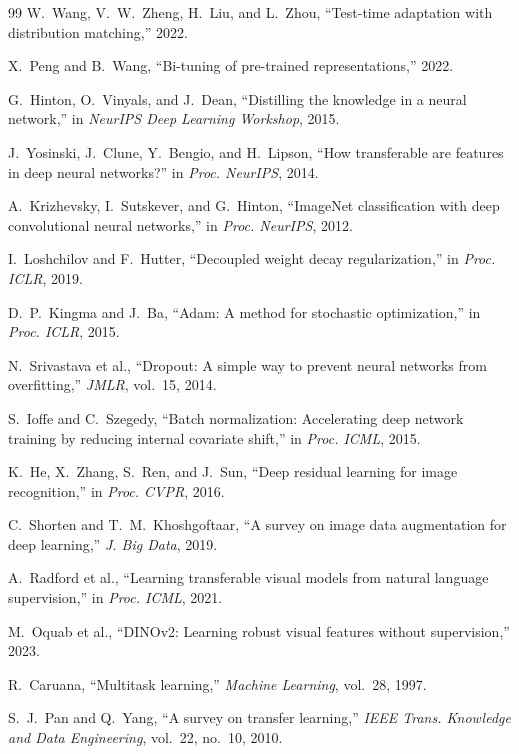 \documentclass[preprint,12pt,number]{elsarticle}
\begin{document}
\begin{thebibliography}{99}
W.~Wang, V.~W.~Zheng, H.~Liu, and L.~Zhou, ``Test-time adaptation with
distribution matching,'' 2022.

X.~Peng and B.~Wang, ``Bi-tuning of pre-trained representations,'' 2022.

G.~Hinton, O.~Vinyals, and J.~Dean, ``Distilling the knowledge in a neural
network,'' in \emph{NeurIPS Deep Learning Workshop}, 2015.

J.~Yosinski, J.~Clune, Y.~Bengio, and H.~Lipson, ``How transferable are
features in deep neural networks?'' in \emph{Proc. NeurIPS}, 2014.

A.~Krizhevsky, I.~Sutskever, and G.~Hinton, ``ImageNet classification with
deep convolutional neural networks,'' in \emph{Proc. NeurIPS}, 2012.

I.~Loshchilov and F.~Hutter, ``Decoupled weight decay regularization,'' in
\emph{Proc. ICLR}, 2019.

D.~P.~Kingma and J.~Ba, ``Adam: A method for stochastic optimization,'' in
\emph{Proc. ICLR}, 2015.

N.~Srivastava et al., ``Dropout: A simple way to prevent neural networks
from overfitting,'' \emph{JMLR}, vol.~15, 2014.

S.~Ioffe and C.~Szegedy, ``Batch normalization: Accelerating deep network
training by reducing internal covariate shift,'' in \emph{Proc. ICML}, 2015.

K.~He, X.~Zhang, S.~Ren, and J.~Sun, ``Deep residual learning for image
recognition,'' in \emph{Proc. CVPR}, 2016.

C.~Shorten and T.~M.~Khoshgoftaar, ``A survey on image data augmentation
for deep learning,'' \emph{J. Big Data}, 2019.

A.~Radford et al., ``Learning transferable visual models from natural
language supervision,'' in \emph{Proc. ICML}, 2021.

M.~Oquab et al., ``DINOv2: Learning robust visual features without
supervision,'' 2023.

R.~Caruana, ``Multitask learning,'' \emph{Machine Learning}, vol.~28, 1997.

S.~J.~Pan and Q.~Yang, ``A survey on transfer learning,'' \emph{IEEE Trans.
Knowledge and Data Engineering}, vol.~22, no.~10, 2010.


\end{thebibliography}
\end{document}
